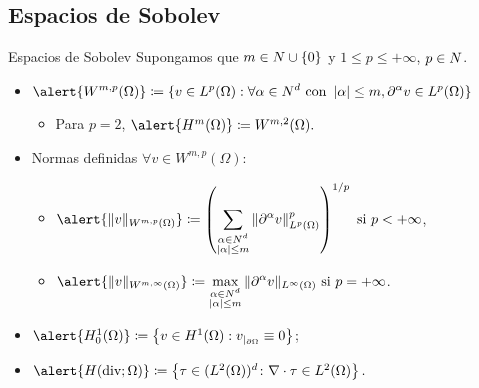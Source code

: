 \subsection{Espacios de Sobolev}
\begin{frame}{Espacios de Sobolev}
Supongamos que $m\in\relax N\cup\left\{0\right\}$ y $1\leq p\leq+\infty$, $p\in\relax N$.
\begin{itemize}\itemsep1em
	\item$\displaystyle\alert{W^{m,p}(\Omega)}\coloneqq\{v\in L^p(\Omega):\forall\alpha\in\N^d\mbox{ con }\left|\alpha\right|\leq m, \partial^\alpha v\in L^p(\Omega)\}$
	\begin{itemize}\itemsep1em
		\item Para $p=2$, $\alert{H^{m}(\Omega)}\coloneqq W^{m,2}(\Omega).$
	\end{itemize}
	
	\item Normas definidas $\forall v\in W^{m,p}(\Omega)$:
	\begin{itemize}\itemsep1em
		\item $\displaystyle \alert{\|v\|_{W^{m,p}(\Omega)}}\coloneqq\left(\suma{\substack{\alpha\in\N^d \\ \left|\alpha\right|\leq m}}{}\|\partial^\alpha v\|^p_{L^p(\Omega)}\right)^{1/p}\text{ si }p<+\infty$,
		\item $\displaystyle \alert{\|v\|_{W^{m,\infty}(\Omega)}}\coloneqq\max_{\substack{\alpha\in\N^d \\ \left|\alpha\right|\leq m}}{}\|\partial^\alpha v\|_{L^\infty(\Omega)}\text{ si }p=+\infty$.
	\end{itemize}
	
	\item $\alert{H_0^1(\Omega)}\coloneqq\left\{v\in H^1(\Omega):v_{|_{\partial\Omega}}\equiv 0\right\}$;
	\item $\alert{H(\text{div};\Omega)}\coloneqq\left\{\tau\in(L^2(\Omega))^d\colon\nabla\cdot\tau\in L^2(\Omega) \right\}.$
	
\end{itemize}

\end{frame}

